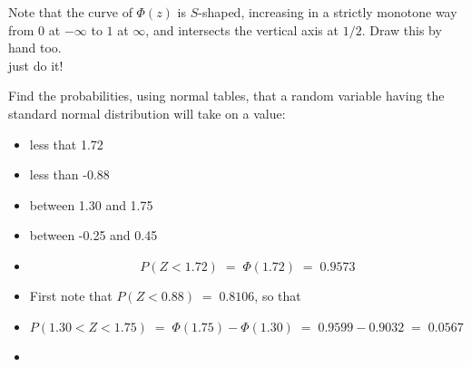 \begin{classwork}\label{xDrawDFOfStdNormal}
{Note that the curve of $\Phi(z)$ is $S$-shaped, increasing in a strictly monotone way from $0$ at $-\infty$ to $1$ at $\infty$, and intersects the vertical axis at $1/2$. Draw this by hand too.}\\[4pt]
just do it! \vspace*{20mm}
\end{classwork}

\begin{example}\label{Eg:UsingNormalTables}
Find the probabilities, using  normal tables,  that a random variable having the standard
  normal distribution will take on a value:
\begin{itemize}
\item [(a)] less that 1.72
\item [(b)]less than -0.88
\item [(c)]between 1.30 and 1.75
\item [(d)] between -0.25 and 0.45
\end{itemize}\ecols
\begin{itemize}
 \item [(a)]
$$P(Z<1.72)\;=\;\Phi(1.72) \;=\; 0.9573$$
 \item [(b)] First note that $P(Z<0.88)\;=\;0.8106$, so that
 \item [(c)]
$P(1.30<Z<1.75)\;=\;\Phi(1.75)-\Phi(1.30)\;=\;0.9599-0.9032\;=\;0.0567$
 \item [(d)]
\end{itemize}
\end{example}
\bigskip
